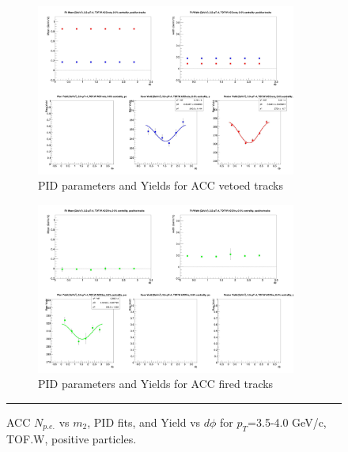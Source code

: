 \begin{figure}[H]
  \ContinuedFloat
    \vspace*{-1cm}
    \begin{subfigure}{1\textwidth}
   \centering
   \includegraphics[width=0.94\textwidth]{hiptfits/pos/fitParams_tof2_cent0_ch1_pT-35-40.jpg}
    \caption{PID parameters and Yields for ACC vetoed tracks}
    \end{subfigure}    
    \begin{subfigure}{1\textwidth}
   \centering
   \includegraphics[width=0.94\textwidth]{hiptfits/pos/fitParams_tof3_cent0_ch1_pT-35-40.jpg}
    \caption{PID parameters and Yields for ACC fired tracks}
    \end{subfigure} 
    \rule{35em}{0.5pt}
  \caption[ACC $N_{p.e.}$ vs $m_2$, PID fits, and Yield vs $d\phi$ for $p_T$=3.5-4.0 GeV/c, TOF.W, positive particles.]{ACC $N_{p.e.}$ vs $m_2$, PID fits, and Yield vs $d\phi$ for $p_T$=3.5-4.0 GeV/c, TOF.W, positive particles.}
  \label{fig:acc35-40pos}
\end{figure}

